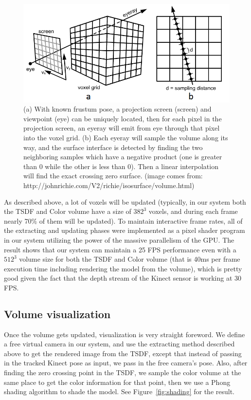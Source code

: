 \documentclass[12pt]{article}
\begin{document}
\begin{figure}[h!]
\includegraphics[width=\textwidth]{raycasting.png}
\caption{\label{fig:raycasting} (a) With known frustum pose, a projection screen (screen) and viewpoint (eye) can be uniquely located, then for each pixel in the projection screen, an eyeray will emit from eye through that pixel into the voxel grid. (b) Each eyeray will sample the volume along its way, and the surface interface is detected by finding the two neighboring samples which have a negative product (one is greater than 0 while the other is less than 0). Then a linear interpolation will find the exact crossing zero surface. (image comes from: http://johnrichie.com/V2/richie/isosurface/volume.html)}
\end{figure}

As described above, a lot of voxels will be updated (typically, in our system both the TSDF and Color volume have a size of $382^3$ voxels, and during each frame nearly 70\% of them will be updated). To maintain interactive frame rates, all of the extracting and updating phases were implemented as a pixel shader program in our system utilizing the power of the massive parallelism of the GPU. The result shows that our system can maintain a 25 FPS performance even with a $512^3$ volume size for both the TSDF and Color volume (that is 40ms per frame execution time including rendering the model from the volume), which is pretty good given the fact that the depth stream of the Kinect sensor is working at 30 FPS.

\subsection{Volume visualization}
Once the volume gets updated, visualization is very straight foreword. We define a free virtual camera in our system, and use the extracting method described above to get the rendered image from the TSDF, except that instead of passing in the tracked Kinect pose as input, we pass in the free camera's pose. Also, after finding the zero crossing point in the TSDF, we sample the color volume at the same place to get the color information for that point, then we use a Phong shading algorithm to shade the model. See Figure~\ref{fig:shading} for the result.
\end{document}
